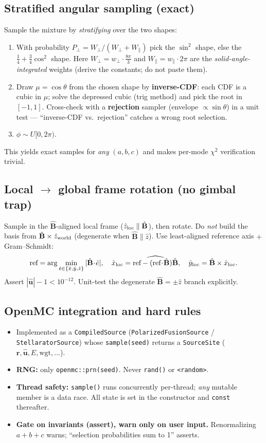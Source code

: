 \documentclass[11pt]{article}
\newcommand{\Bhat}{\hat{\mathbf{B}}}
\newcommand{\uu}{\hat{\mathbf{u}}}
\begin{document}
\subsection{Stratified angular sampling (exact)}
Sample the mixture by \emph{stratifying} over the two shapes:
\begin{enumerate}
\item With probability $P_\perp = W_\perp/(W_\perp+W_\parallel)$ pick the $\sin^2$ shape, else the
  $\tfrac14+\tfrac34\cos^2$ shape. Here $W_\perp=w_\perp\cdot\tfrac{8\pi}{3}$ and
  $W_\parallel=w_\parallel\cdot 2\pi$ are the \emph{solid-angle-integrated} weights (derive the
  constants; do not paste them).
\item Draw $\mu=\cos\theta$ from the chosen shape by \textbf{inverse-CDF}: each CDF is a cubic in
  $\mu$; solve the depressed cubic (trig method) and pick the root in $[-1,1]$. Cross-check with a
  \textbf{rejection} sampler (envelope $\propto\sin\theta$) in a unit test --- ``inverse-CDF vs.\
  rejection'' catches a wrong root selection.
\item $\phi\sim U[0,2\pi)$.
\end{enumerate}
This yields exact samples for \emph{any} $(a,b,c)$ and makes per-mode $\chi^2$ verification
trivial.

\subsection{Local $\to$ global frame rotation (no gimbal trap)}
Sample in the $\Bhat$-aligned local frame ($\hat z_{\rm loc}\parallel\Bhat$), then rotate. Do
\emph{not} build the basis from $\Bhat\times\hat z_{\rm world}$ (degenerate when
$\Bhat\parallel\hat z$). Use least-aligned reference axis $+$ Gram--Schmidt:
\[
\text{ref}=\arg\min_{\hat e\in\{\hat x,\hat y,\hat z\}}|\Bhat\!\cdot\!\hat e|,\quad
\hat x_{\rm loc}=\widehat{\text{ref}-(\text{ref}\!\cdot\!\Bhat)\Bhat},\quad
\hat y_{\rm loc}=\Bhat\times\hat x_{\rm loc}.
\]
Assert $|\uu|-1<10^{-12}$. Unit-test the degenerate $\Bhat=\pm\hat z$ branch explicitly.

\subsection{OpenMC integration and hard rules}
\begin{itemize}
\item Implemented as a \texttt{CompiledSource} (\texttt{PolarizedFusionSource} /
  \texttt{StellaratorSource}) whose \texttt{sample(seed)} returns a \texttt{SourceSite}
  ($\mathbf{r},\uu,E,\text{wgt},\dots$).
\item \textbf{RNG:} only \texttt{openmc::prn(seed)}. Never \texttt{rand()} or \texttt{<random>}.
\item \textbf{Thread safety:} \texttt{sample()} runs concurrently per-thread; \emph{any} mutable
  member is a data race. All state is set in the constructor and \texttt{const} thereafter.
\item \textbf{Gate on invariants (assert), warn only on user input.} Renormalizing $a+b+c$ warns;
  ``selection probabilities sum to 1'' asserts.
\end{itemize}
\end{document}
